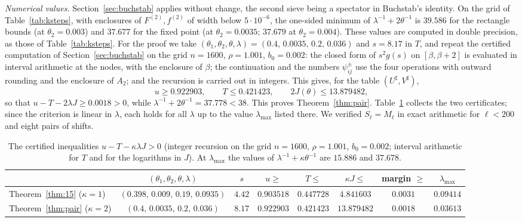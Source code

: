 \documentclass[11pt,a4paper]{amsart}
\theoremstyle{remark}
\numberwithin{equation}{section}
\begin{document}
\emph{Numerical values.} Section~\ref{sec:buchstab} applies without change, the second sieve being a spectator in
Buchstab's identity. On the grid of Table~\ref{tab:ksteps}, with enclosures of $F^{(2)},f^{(2)}$ of width below
$5\cdot10^{-6}$, the one-sided minimum of $\lambda^{-1}+2\theta^{-1}$ is $39.586$ for the rectangle bounds (at
$\theta_2=0.003$) and $37.677$ for the fixed point (at $\theta_2=0.0035$; $37.679$ at $\theta_2=0.004$). These
values are computed in double precision, as those of Table~\ref{tab:ksteps}. For the proof we take
$(\theta_1,\theta_2,\theta,\lambda)=(0.4,\,0.0035,\,0.2,\,0.036)$ and $s=8.17$ in $T$, and repeat the certified
computation of Section~\ref{sec:buchstab} on the grid $n=1600$, $\rho=1.001$, $b_0=0.002$: the closed form of
$s^2g(s)$ on $[\beta,\beta+2]$ is evaluated in interval arithmetic at the nodes, with the enclosure of $\beta$; the
continuation and the numbers $\psi^\pm_{ij}$ use the four operations with outward rounding and the enclosure of
$A_2$; and the recursion is carried out in integers. This gives, for the table $(U^\sharp,V^\sharp)$,
\[
u\ge0.922903,\qquad T\le0.421423,\qquad 2J(\theta)\le13.879482,
\]
so that $u-T-2\lambda J\ge0.0018>0$, while $\lambda^{-1}+2\theta^{-1}=37.778<38$. This proves
Theorem~\ref{thm:pair}. Table~\ref{tab:cert} collects the two certificates; since the criterion is linear in
$\lambda$, each holds for all $\lambda$ up to the value $\lambda_{\max}$ listed there. We verified
$S_\ell=M_\ell$ in exact arithmetic for $\ell<200$ and eight pairs of shifts.

\begin{table}[htbp]
\centering\footnotesize\setlength{\tabcolsep}{3pt}
\begin{tabular}{lccccccc}
\toprule
& $(\theta_1,\theta_2,\theta,\lambda)$ & $s$ & $u\ge$ & $T\le$ & $\kappa J\le$ & margin $\ge$ & $\lambda_{\max}$\\
\midrule
Theorem~\ref{thm:15} ($\kappa=1$) & $(0.398,\,0.009,\,0.19,\,0.0935)$ & $4.42$ & $0.903518$ & $0.447728$ & $4.841603$ & $0.0031$ & $0.09414$\\
Theorem~\ref{thm:pair} ($\kappa=2$) & $(0.4,\,0.0035,\,0.2,\,0.036)$ & $8.17$ & $0.922903$ & $0.421423$ & $13.879482$ & $0.0018$ & $0.03613$\\
\bottomrule
\end{tabular}
\caption{The certified inequalities $u-T-\kappa\lambda J>0$ (integer recursion on the grid $n=1600$, $\rho=1.001$,
$b_0=0.002$; interval arithmetic for $T$ and for the logarithms in $J$). At $\lambda_{\max}$ the values of
$\lambda^{-1}+\kappa\theta^{-1}$ are $15.886$ and $37.678$.}
\label{tab:cert}
\end{table}
\end{document}
